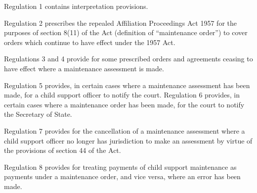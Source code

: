 \documentclass[a4paper]{article}
\begin{document}
  Regulation 1 contains interpretation provisions.

  Regulation 2 prescribes the repealed Affiliation Proceedings Act 1957 for the purposes of section 8(11) of the Act (definition of “maintenance order”) to cover orders which continue to have effect under the 1957 Act.

  Regulations 3 and 4 provide for some prescribed orders and agreements ceasing to have effect where a maintenance assessment is made.

  Regulation 5 provides, in certain cases where a maintenance assessment has been made, for a child support officer to notify the court. Regulation 6 provides, in certain cases where a maintenance order has been made, for the court to notify the Secretary of State.

  Regulation 7 provides for the cancellation of a maintenance assessment where a child support officer no longer has jurisdiction to make an assessment by virtue of the provisions of section 44 of the Act.

  Regulation 8 provides for treating payments of child support maintenance as payments under a maintenance order, and vice versa, where an error has been made.
\end{document}
